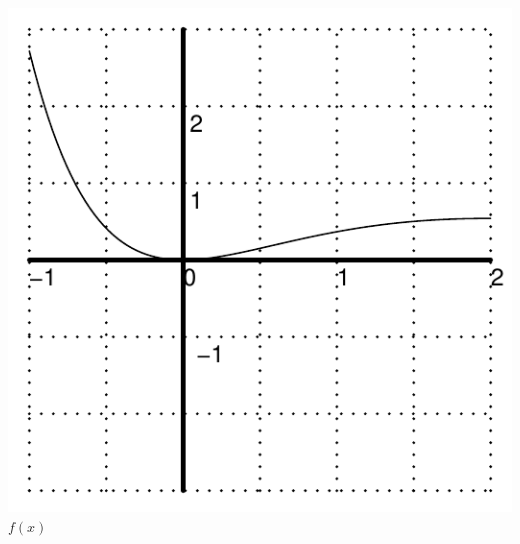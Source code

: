 \begin{minipage}[h]{0.3\linewidth}
\begin{center}
  \includegraphics[width=1.0\linewidth]{graphics/notes_01_f_and_deriv_graph_f} \\
  $f(x)$
\end{center}
\end{minipage}
